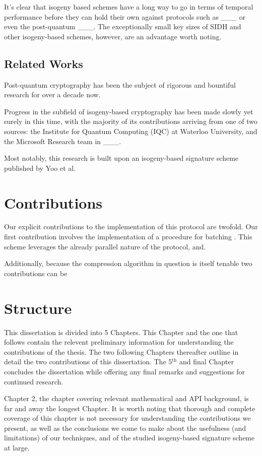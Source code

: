 It's clear that isogeny based schemes have a long way to go in terms of temporal performance before they can hold their own against protocols such as \_\_\_ or even the post-quantum \_\_\_. The exceptionally small key sizes of SIDH and other isogeny-based schemes, however, are an advantage worth noting. 

\subsection{Related Works}

Post-quantum cryptography has been the subject of rigorous and bountiful research for over a decade now. 

Progress in the subfield of isogeny-based cryptography has been made slowly yet surely in this time, with the majority of its contributions arriving from one of two sources: the Institute for Quantum Computing (IQC) at Waterloo University, and the Microsoft Research team in \_\_\_. 

Most notably, this research is built upon an isogeny-based signature scheme published by Yoo et al. 

\section{Contributions}

Our explicit contributions to the implementation of this protocol are twofold. Our first contribution involves the implementation of a procedure for batching . This scheme leverages the already parallel nature of the protocol, and.

Additionally, because the compression algorithm in question is itself tenable two contributions can be 


\section{Structure}

This dissertation is divided into 5 Chapters. This Chapter and the one that follows contain the relevent preliminary information for understanding the contributions of the thesis. The two following Chapters thereafter outline in detail the two contributions of this dissertation. The 5$^{\text{th}}$ and final Chapter concludes the dissertation while offering any final remarks and suggestions for continued research.

Chapter 2, the chapter covering relevant mathematical and API background, is far and away the longest Chapter. It is worth noting that thorough and complete coverage of this chapter is not necessary for understanding the contributions we present, as well as the conclusions we come to make about the usefulness (and limitations) of our techniques, and of the studied isogeny-based signature scheme at large.

